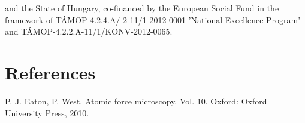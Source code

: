 \documentclass[3p]{elsarticle}
\begin{document}
and the State of Hungary, co-financed by the European Social Fund in the framework of T\'{A}MOP-4.2.4.A/ 2-11/1-2012-0001 'National Excellence Program' and T\'{A}MOP-4.2.2.A-11/1/KONV-2012-0065.

\section*{References}

\begin{thebibliography}{5}

P. J. Eaton, P. West. Atomic force microscopy. Vol. 10. Oxford: Oxford University Press, 2010.

\end{thebibliography}
\end{document}
